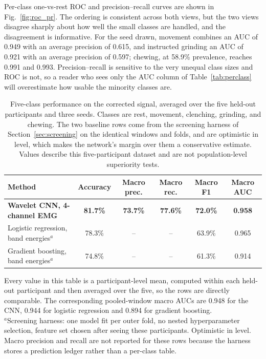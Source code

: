 \documentclass[pdflatex,sn-nature,iicol]{sn-jnl}
\begin{document}
Per-class one-vs-rest ROC and precision--recall curves are shown in Fig.~\ref{fig:roc_pr}. The ordering is consistent across both views, but the two views disagree sharply about how well the small classes are handled, and the disagreement is informative. For the seed drawn, movement combines an AUC of 0.949 with an average precision of 0.615, and instructed grinding an AUC of 0.921 with an average precision of 0.597; chewing, at 58.9\% prevalence, reaches 0.991 and 0.993. Precision--recall is sensitive to the very unequal class sizes and ROC is not, so a reader who sees only the AUC column of Table~\ref{tab:perclass} will overestimate how usable the minority classes are.

\begin{table}[t]
  \centering
  \caption{Five-class performance on the corrected signal, averaged over the five held-out participants and three seeds. Classes are rest, movement, clenching, grinding, and chewing. The two baseline rows come from the screening harness of Section~\ref{sec:screening} on the identical windows and folds, and are optimistic in level, which makes the network's margin over them a conservative estimate. Values describe this five-participant dataset and are not population-level superiority tests.}
  \label{tab:results}
  \small
  \begin{tabular}{lccccc}
    \toprule
    Method & Accuracy & Macro prec. & Macro rec. & Macro F1 & Macro AUC \\
    \midrule
    \textbf{Wavelet CNN, 4-channel EMG} & \textbf{81.7\%} & \textbf{73.7\%} & \textbf{77.6\%} & \textbf{72.0\%} & \textbf{0.958} \\
    \midrule
    Logistic regression, band energies$^{a}$ & 78.3\% & -- & -- & 63.9\% & 0.965 \\
    Gradient boosting, band energies$^{a}$ & 74.8\% & -- & -- & 61.3\% & 0.914 \\
    \bottomrule
  \end{tabular}
  \begin{flushleft}\footnotesize
  Every value in this table is a participant-level mean, computed within each held-out participant and then averaged over the five, so the rows are directly comparable. The corresponding pooled-window macro AUCs are 0.948 for the CNN, 0.944 for logistic regression and 0.894 for gradient boosting.\\
  $^{a}$Screening harness: one model fit per outer fold, no nested hyperparameter selection, feature set chosen after seeing these participants. Optimistic in level. Macro precision and recall are not reported for these rows because the harness stores a prediction ledger rather than a per-class table.
  \end{flushleft}
\end{table}
\end{document}
